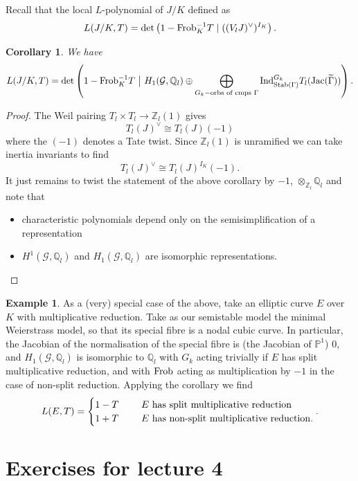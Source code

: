 \documentclass[12pt]{amsart}
\numberwithin{equation}{section}
\newtheorem{cor}[equation]{Corollary}
\theoremstyle{remark}
\theoremstyle{definition}
\newtheorem{example}[equation]{Example}
\theoremstyle{definition}
\theoremstyle{definition}
\theoremstyle{definition}
\theoremstyle{definition}
\theoremstyle{definition}
\begin{document}
Recall that the local $L$-polynomial of $J/K$ defined as
\[L(J/K,T)=\textup{det}\left(1-\textup{Frob}_K^{-1}T\mid ((V_lJ)^\vee)^{I_K}\right).\]

\begin{cor}
We have
\[L(J/K,T)=\textup{det}\left(1-\textup{Frob}_{K}^{-1}T~\big\lvert ~H_1(\mathcal{G},\mathbb{Q}_l)\oplus \bigoplus_{G_k-\textup{orbs of cmps }\Gamma}\textup{Ind}_{\textup{Stab}(\Gamma)}^{G_k} T_l (\textup{Jac}(\widetilde{\Gamma})) \right).\]
\end{cor}

\begin{proof}
The Weil pairing $T_l\times T_l\rightarrow \mathbb{Z}_l(1)$ gives 
\[T_l(J)^\vee \cong T_l(J)(-1)\]
where the $(-1)$ denotes a Tate twist. Since $\mathbb{Z}_l(1)$ is unramified we can take inertia invariants to find
\[T_l(J)^\vee \cong T_l(J)^{I_K}(-1).\]
It just remains to twist the statement of the above corollary by $-1$, $\otimes_{\mathbb{Z}_l}\mathbb{Q}_l$ and note that 
\begin{itemize}
\item characteristic polynomials depend only on the semisimplification of a representation
\item $H^1(\mathcal{G},\mathbb{Q}_l)$ and $H_1(\mathcal{G},\mathbb{Q}_l)$ are isomorphic representations.
\end{itemize}
\end{proof}

\begin{example}
As a (very) special case of the above, take an elliptic curve $E$ over $K$ with multiplicative reduction. Take as our semistable model the minimal Weierstrass model, so that its special fibre is a nodal cubic curve. In particular, the Jacobian of the normalisation of the special fibre is (the Jacobian of $\mathbb{P}^1$) $0$, and $H_1(\mathcal{G},\mathbb{Q}_l)$ is isomorphic to $\mathbb{Q}_l$ with $G_k$ acting trivially if $E$ has split multiplicative reduction, and with $\textup{Frob}$ acting as multiplication by $-1$ in the case of non-split reduction. Applying the corollary we find
\[L(E,T)=\begin{cases}
1-T~~&~~E\textup{ has split multiplicative reduction}\\
1+T~~&~~E\textup{ has non-split multiplicative reduction}.
\end{cases}.\]
\end{example}

\newpage

\section{Exercises for lecture 4}
\end{document}
